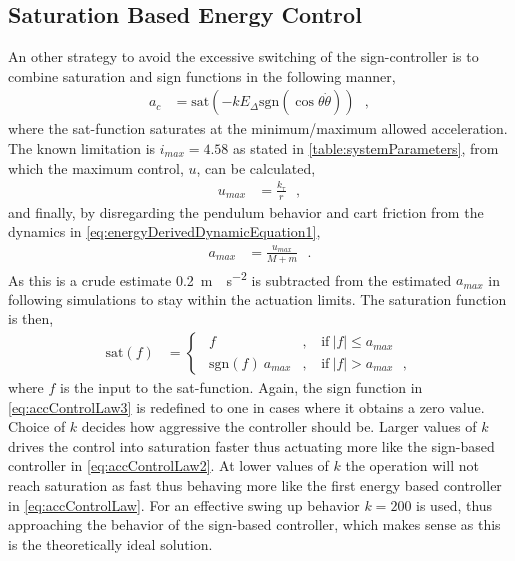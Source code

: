 \subsection{Saturation Based Energy Control}
An other strategy to avoid the excessive switching of the sign-controller is to combine saturation and sign functions in the following manner,
\begin{align}
  a_c &= \mathrm{sat}(-k E_\Delta \mathrm{sgn}(\cos \theta \dot{\theta}))  \ \ \ ,   \label{eq:accControlLaw3} 
\end{align}
where the sat-function saturates at the minimum/maximum allowed acceleration. The known limitation is $i_{max} = 4.58$ as stated in \autoref{table:systemParameters}, from which the maximum control, $u$, can be calculated,
\begin{align}
  u_{max} &=  \frac{k_{\tau}}{r} \ \ \ ,    \label{eq:maxU} 
\end{align}
and finally, by disregarding the pendulum behavior and cart friction from the dynamics in \autoref{eq:energyDerivedDynamicEquation1},
\begin{align}
  a_{max} &= \frac{u_{max}}{M+m} \ \ \ .   \label{eq:maxAcc} 
\end{align}
As this is a crude estimate \SI{0.2}{m\cdot s^{-2}} is subtracted from the estimated $a_{max}$ in following simulations to stay within the actuation limits. The saturation function is then,
\begin{align}
  \text{sat}(f) &=
  \begin{cases}
    \ \ f                           &, \ \ \ \ \mathrm{if} \ | f |  \leq a_{max} \\
    \ \ \mathrm{sgn}( f )\ a_{max}  &, \ \ \ \ \mathrm{if} \ | f |  >  a_{max} \ \ \ ,
  \end{cases}
  \label{eq:satuationFunction2}
\end{align}
where $f$ is the input to the sat-function. Again, the sign function in \autoref{eq:accControlLaw3} is redefined to one in cases where it obtains a zero value.
Choice of $k$ decides how aggressive the controller should be. Larger values of $k$ drives the control into saturation faster thus actuating more like the sign-based controller in \autoref{eq:accControlLaw2}. At lower values of $k$ the operation will not reach saturation as fast thus behaving more like the first energy based controller in \autoref{eq:accControlLaw}. For an effective swing up behavior $k=200$ is used, thus approaching the behavior of the sign-based controller, which makes sense as this is the theoretically ideal solution.\\
